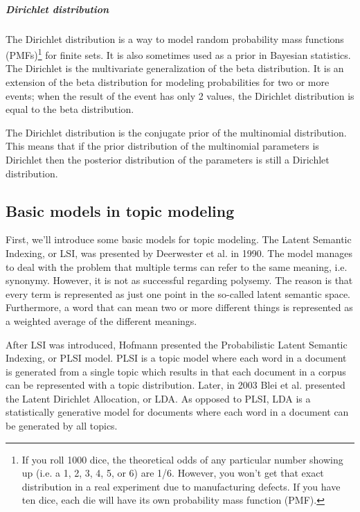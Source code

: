 \documentclass[12pt]{report}
\begin{document}
\subparagraph{Dirichlet distribution}

The Dirichlet distribution is a way to model random probability mass functions
(PMFs)\footnote{If you roll 1000 dice, the theoretical odds of any particular
number showing up (i.e. a 1, 2, 3, 4, 5, or 6) are 1/6. However, you won't get
that exact distribution in a real experiment due to manufacturing defects. If
you have ten dice, each die will have its own probability mass function (PMF).}
for finite sets. It is also sometimes used as a prior in Bayesian statistics.
The Dirichlet is the multivariate generalization of the beta distribution. It
is an extension of the beta distribution for modeling probabilities for two or
more events; when the result of the event has only 2 values, the Dirichlet
distribution is equal to the beta distribution.

The Dirichlet distribution is the conjugate prior of the multinomial
distribution. This means that if the prior distribution of the
multinomial parameters is Dirichlet then the posterior distribution of the
parameters is still a Dirichlet distribution.

\subsection{Basic models in topic modeling}

First, we'll introduce some basic models for topic modeling. The
Latent Semantic Indexing, or LSI, was presented by Deerwester et al.
in 1990\cite{Deerwester90indexingby}. The model manages to deal with the
problem that multiple terms can refer to the same meaning, i.e.
synonymy. However, it is not as successful regarding polysemy. The
reason is that every term is represented as just one point in the
so-called latent semantic space. Furthermore, a word that can mean two
or more different things is represented as a weighted average of the
different meanings.
 
After LSI was introduced, Hofmann presented the Probabilistic Latent
Semantic Indexing, or PLSI model\cite{Hofmann:1999:PLS:312624.312649}. 
PLSI is a topic model where each word in a document is generated 
from a single topic which results in that each document in a corpus 
can be represented with a topic distribution. Later, in 2003 Blei et al. 
presented the Latent Dirichlet Allocation, or LDA\cite{blei2003latent}. 
As opposed to PLSI, LDA is a statistically generative model for documents 
where each word in a document can be generated by all topics.
\end{document}
